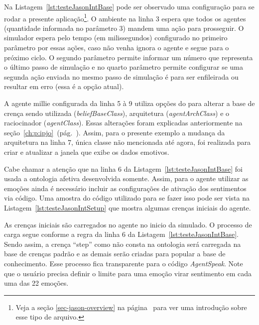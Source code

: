 Na Listagem~\ref{lst:testeJasonIntBase} pode ser observado uma configuração
para se rodar a presente aplicação\footnote{Veja a seção
\ref{sec-jason-overview} na página~\pageref{sec-jason-overview}
para ver uma introdução sobre esse tipo de arquivo.}. O ambiente na linha 3
espera que todos os agentes (quantidade informada no parâmetro 3) mandem
uma ação para prosseguir. O simulador espera pelo tempo (em milissegundos)
configurado no primeiro parâmetro por essas ações, caso não venha ignora o
agente e segue para o próximo ciclo. O segundo parâmetro permite informar
um número que representa o último passo de simulação e no quarto
parâmetro permite configurar se uma segunda ação enviada no mesmo passo de
simulação é para ser enfileirada ou resultar em erro (essa é a opção atual).

\begin{center}
    \begin{minipage}{130mm}
	\lstset{linewidth=130mm}
	
    \end{minipage}
\end{center}

A agente millie configurada da linha 5 à 9 utiliza opções do \jason para
alterar a base de crença sendo utilizada (\emph{beliefBaseClass}),
arquitetura (\emph{agentArchClass}) e o raciocinador
(\emph{agentClass}). Essas alterações foram explicadas anteriormente
na seção~\ref{ch:p:ipjo}~(pág.~\pageref{ch:p:ipjo}).
Assim, para o presente exemplo a mudança da arquitetura na linha 7, única
classe não mencionada até agora, foi realizada para criar e atualizar a janela
que exibe os dados emotivos.

Cabe chamar a atenção que na linha 6 da Listagem~\ref{lst:testeJasonIntBase}
foi usada a ontologia afetiva desenvolvida somente. Assim, para o agente
utilizar as emoções ainda é necessário incluir as configurações de ativação
dos sentimentos via código. Uma amostra do código utilizado para se fazer isso
pode ser vista na Listagem~\ref{lst:testeJasonIntSetup} que mostra algumas
crenças iniciais do agente.

As crenças iniciais são carregados no agente no inicio da simulado. O processo
de carga segue conforme a regra da linha 6 da
Listagem~\ref{lst:testeJasonIntBase}. Sendo assim, a crença ``step'' como não
consta na ontologia será carregada na base de crenças padrão e as demais serão
criadas para popular a base de conhecimento. Esse processo fica transparente
para o código \emph{AgentSpeak}. Note que o usuário precisa definir o limite
para uma emoção virar sentimento em cada uma das 22 emoções.

